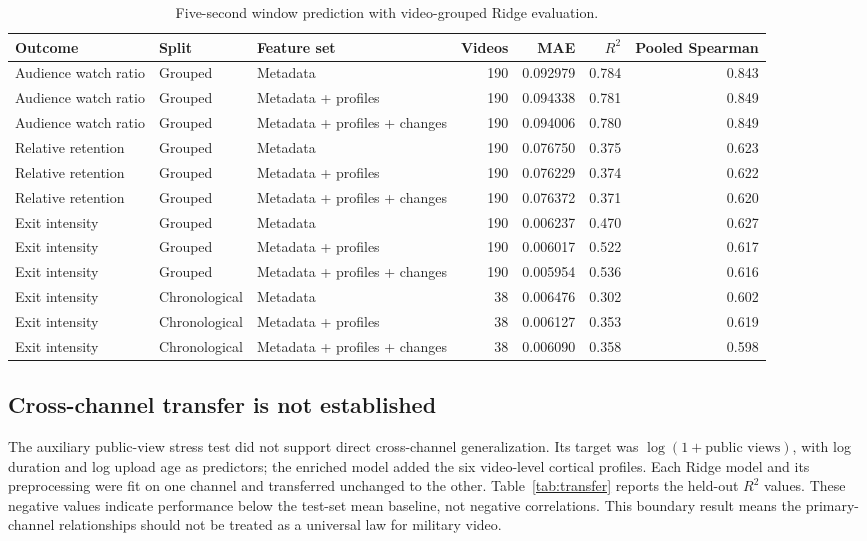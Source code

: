 \documentclass{ieeeaccess}
\begin{document}
\begin{table}[t]
\caption{Five-second window prediction with video-grouped Ridge evaluation.}
\label{tab:prediction}
\centering
\renewcommand{\arraystretch}{1.1}
\tablebodyfont
\begin{tabular}{@{}lllrrrr@{}}
\toprule
Outcome & Split & Feature set & Videos & MAE & $R^2$ & Pooled Spearman \\
\midrule
Audience watch ratio & Grouped & Metadata & 190 & 0.092979 & 0.784 & 0.843 \\
Audience watch ratio & Grouped & Metadata + profiles & 190 & 0.094338 & 0.781 & 0.849 \\
Audience watch ratio & Grouped & Metadata + profiles + changes & 190 & 0.094006 & 0.780 & 0.849 \\
Relative retention & Grouped & Metadata & 190 & 0.076750 & 0.375 & 0.623 \\
Relative retention & Grouped & Metadata + profiles & 190 & 0.076229 & 0.374 & 0.622 \\
Relative retention & Grouped & Metadata + profiles + changes & 190 & 0.076372 & 0.371 & 0.620 \\
Exit intensity & Grouped & Metadata & 190 & 0.006237 & 0.470 & 0.627 \\
Exit intensity & Grouped & Metadata + profiles & 190 & 0.006017 & 0.522 & 0.617 \\
Exit intensity & Grouped & Metadata + profiles + changes & 190 & 0.005954 & 0.536 & 0.616 \\
Exit intensity & Chronological & Metadata & 38 & 0.006476 & 0.302 & 0.602 \\
Exit intensity & Chronological & Metadata + profiles & 38 & 0.006127 & 0.353 & 0.619 \\
Exit intensity & Chronological & Metadata + profiles + changes & 38 & 0.006090 & 0.358 & 0.598 \\
\bottomrule
\end{tabular}
\end{table}

\subsection{Cross-channel transfer is not established}
The auxiliary public-view stress test did not support direct cross-channel generalization. Its target was $\log(1+\text{public views})$, with log duration and log upload age as predictors; the enriched model added the six video-level cortical profiles. Each Ridge model and its preprocessing were fit on one channel and transferred unchanged to the other. Table~\ref{tab:transfer} reports the held-out $R^2$ values. These negative values indicate performance below the test-set mean baseline, not negative correlations. This boundary result means the primary-channel relationships should not be treated as a universal law for military video.
\end{document}
